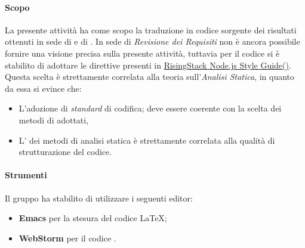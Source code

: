                 \paragraph*{Scopo}
                La presente attivit\`a ha come scopo la traduzione in codice sorgente dei risultati ottenuti in sede
                di  e di .
                In sede di \textit{Revisione dei Requisiti} non \`e ancora possibile fornire una visione precisa sulla presente attivit\`a,
                tuttavia per il codice  
                si \`e stabilito di adottare le direttive presenti in \href{https://github.com/RisingStack/node-style-guide/blob/master/README.md}{RisingStack Node.js Style Guide()}.
                Questa scelta \`e strettamente correlata alla teoria sull'\textit{Analisi Statica}, in quanto da essa si evince che:
                \begin{itemize}
		  \item L’adozione di \textit{standard} di codifica;
                    deve essere coerente con la scelta dei metodi di  adottati,         
		  \item L’ dei metodi di analisi statica \`e strettamente correlata alla qualit\`a di strutturazione del codice.
                \end{itemize}
                
                \paragraph*{Strumenti}
                Il gruppo ha stabilito di utilizzare i seguenti editor:
                \begin{itemize}
                  \item \textbf{Emacs} per la stesura del codice \LaTeX;    %
                  \item \textbf{WebStorm} per il codice .      %
                \end{itemize}
